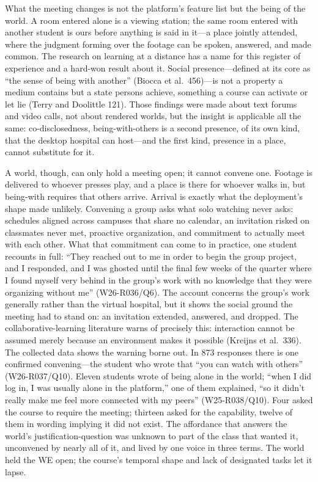 What the meeting changes is not the platform's feature list but the
being of the world. A room entered alone is a viewing station; the
same room entered with another student is ours before anything is said
in it---a place jointly attended, where the judgment forming over the
footage can be spoken, answered, and made common. The research on
learning at a distance has a name for this register of experience and
a hard-won result about it. Social presence---defined at its core as
``the sense of being with another'' (Biocca et al.\ 456)---is not a
property a medium contains but a state persons achieve, something a
course can activate or let lie (Terry and Doolittle 121). Those
findings were made about text forums and video calls, not about
rendered worlds, but the insight is applicable all the same:
co-disclosedness, being-with-others is a second presence, of its own
kind, that the desktop hospital can host---and the first kind, presence
in a place, cannot substitute for it.

A world, though, can only hold a meeting open; it cannot convene one.
Footage is delivered to whoever presses play, and a place is there for
whoever walks in, but being-with requires that others arrive. Arrival
is exactly what the deployment's shape made unlikely. Convening a
group asks what solo watching never asks: schedules aligned across
campuses that share no calendar, an invitation risked on classmates
never met, proactive organization, and commitment to actually meet
with each other. What that commitment can come to in practice, one
student recounts in full: ``They reached out to me in order to begin the
group project, and I responded, and I was ghosted until the final few
weeks of the quarter where I found myself very behind in the group's work
with no knowledge that they were organizing without me'' (W26-R036/Q6).
The account concerns the group's work generally rather than the virtual
hospital, but it shows the social ground the meeting had to stand on: an
invitation extended, answered, and dropped. The collaborative-learning
literature warns of precisely this: interaction cannot be assumed
merely because an environment makes it possible (Kreijns et al.\ 336).
The collected data shows the warning borne out. In 873 responses there
is one confirmed convening---the student who wrote that ``you can
watch with others'' (W26-R037/Q10). Eleven students wrote of being
alone in the world; ``when I did log in, I was usually alone in the
platform,'' one of them explained, ``so it didn't really make me feel
more connected with my peers'' (W25-R038/Q10). Four asked the course
to require the meeting; thirteen asked for the capability, twelve of
them in wording implying it did not exist. The affordance that answers
the world's justification-question was unknown to part of the class
that wanted it, unconvened by nearly all of it, and lived by one voice
in three terms. The world held the WE open; the course's temporal
shape and lack of designated tasks let it lapse.

